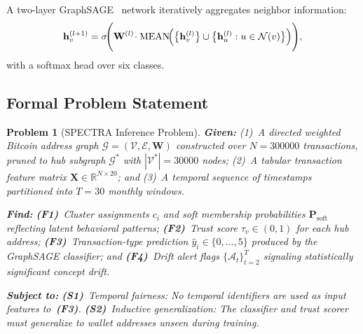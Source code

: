 \documentclass[journal]{IEEEtran}
\newtheorem{problem}{Problem}[section]
\newcommand{\spectra}{\textsc{SPECTRA}}
\begin{document}
A two-layer GraphSAGE~\cite{Hamilton2017} network iteratively aggregates
neighbor information:
\begin{equation}
  \mathbf{h}_{v}^{(l+1)}
    = \sigma\!\Biggl(
        \mathbf{W}^{(l)}\!
        \cdot
        \mathrm{MEAN}\!\Bigl(
          \bigl\{\mathbf{h}_{v}^{(l)}\bigr\}
          \cup
          \bigl\{\mathbf{h}_{u}^{(l)} : u\in\mathcal{N}(v)\bigr\}
        \Bigr)
      \Biggr),
  \label{eq:graphsage}
\end{equation}
with a softmax head over six classes.

\subsection{Formal Problem Statement}
\label{subsec:problem_stmt}

\begin{mdframed}[linewidth=0.8pt, innertopmargin=8pt, innerbottommargin=8pt,
                 innerleftmargin=10pt, innerrightmargin=10pt]
\begin{problem}[\spectra{} Inference Problem]
\label{prob:spectra}
\textbf{Given:}
(1)~A directed weighted Bitcoin address graph
$\mathcal{G}=(\mathcal{V},\mathcal{E},\mathbf{W})$
constructed over $N=\num{300000}$ transactions, pruned to hub subgraph
$\mathcal{G}^{*}$ with $|\mathcal{V}^{*}|=\num{30000}$ nodes;
(2)~A tabular transaction feature matrix
$\mathbf{X}\in\mathbb{R}^{N\times 20}$; and
(3)~A temporal sequence of timestamps partitioned into $T=30$ monthly windows.

\medskip
\textbf{Find:}
\textbf{(F1)}~Cluster assignments $c_{i}$ and soft membership probabilities
$\mathbf{P}_{\mathrm{soft}}$ reflecting latent behavioral patterns;
\textbf{(F2)}~Trust score $\tau_{v}\in(0,1)$ for each hub address;
\textbf{(F3)}~Transaction-type prediction $\hat{y}_{i}\in\{0,\ldots,5\}$
produced by the GraphSAGE classifier; and
\textbf{(F4)}~Drift alert flags $\{\mathcal{A}_{t}\}_{t=2}^{T}$ signaling
statistically significant concept drift.

\medskip
\textbf{Subject to:}
\textbf{(S1)}~\emph{Temporal fairness}: No temporal identifiers are used as
input features to~\textbf{(F3)}.
\textbf{(S2)}~\emph{Inductive generalization}: The classifier and trust scorer
must generalize to wallet addresses unseen during training.
\end{problem}
\end{mdframed}

\FloatBarrier
\end{document}
